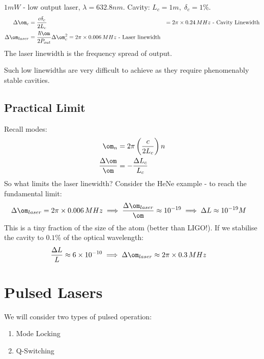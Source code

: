 \documentclass[a4paper, 11pt, normalem]{report}
\begin{document}
\begin{example}
$1mW$ - low output laser, $\lambda=632.8nm$.
Cavity: $L_c=1m,\;\delta_c=1\%$.
\begin{align}
    \Delta\om_c &= \frac{c\delta_c}{2L_c} &= 2\pi\times0.24\,MHz \text{ - Cavity Linewidth} \\
    \Delta\om_{laser} &= \frac{\hbar\om}{2P_{out}}\Delta\om_c^2 = 2\pi\times0.006\,MHz \text{ - Laser linewidth}
\end{align}
The laser linewidth is the frequency spread of output. 
\end{example}
Such low linewidths are very difficult to achieve as they require phenomenably stable cavities. 

\section{Practical Limit}
Recall modes:
\begin{align}
    \om_n &= 2\pi\left(\frac{c}{2L_c}\right)n \\
    \frac{\Delta\om}{\om} &= -\frac{\Delta L_c}{L_c}
\end{align}
So what limits the laser linewidth?
Consider the HeNe example - to reach the fundamental limit:
\begin{align}
    \Delta\om_{laser} &= 2\pi\times0.006\,MHz \implies \frac{\Delta\om_{laser}}{\om} \approx 10^{-19} \implies \Delta L \approx 10^{-19}M
\end{align}
This is a tiny fraction of the size of the atom (better than LIGO!).
If we stabilise the cavity to $0.1\%$ of the optical wavelength:
\begin{align}
    \frac{\Delta L}{L} &\approx 6\times10^{-10} \implies \Delta\om_{laser} \approx 2\pi\times0.3\,MHz
\end{align}



\chapter{Pulsed Lasers}
We will consider two types of pulsed operation:
\begin{enumerate}
    \item Mode Locking
    \item Q-Switching
\end{enumerate}
\end{document}
